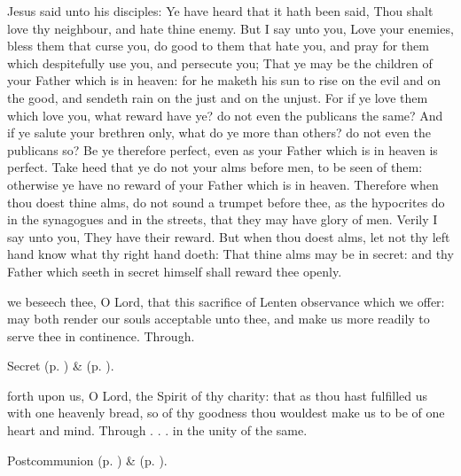  Jesus said unto his disciples: Ye have heard that it hath been said, Thou shalt love thy neighbour, and hate thine enemy. But I say unto you, Love your enemies, bless them that curse you, do good to them that hate you, and pray for them which despitefully use you, and persecute you; That ye may be the children of your Father which is in heaven: for he maketh his sun to rise on the evil and on the good, and sendeth rain on the just and on the unjust. For if ye love them which love you, what reward have ye? do not even the publicans the same? And if ye salute your brethren only, what do ye more than others? do not even the publicans so? Be ye therefore perfect, even as your Father which is in heaven is perfect. Take heed that ye do not your alms before men, to be seen of them: otherwise ye have no reward of your Father which is in heaven. Therefore when thou doest thine alms, do not sound a trumpet before thee, as the hypocrites do in the synagogues and in the streets, that they may have glory of men. Verily I say unto you, They have their reward. But when thou doest alms, let not thy left hand know what thy right hand doeth: That thine alms may be in secret: and thy Father which seeth in secret himself shall reward thee openly.


\secret
{} we beseech thee, O Lord, that this sacrifice of Lenten observance which we offer: may both render our souls acceptable unto thee, and make us more readily to serve thee in continence. Through.

\begin{rubric}
     Secret  (p. \pageref{AshWednesdayMassSecret}) \&   (p. \pageref{SPLivingDeparted}).
\end{rubric}


\postcommunion
{} forth upon us, O Lord, the Spirit of thy charity: that as thou hast fulfilled us with one heavenly bread, so of thy goodness thou wouldest make us to be of one heart and mind. Through . . . in the unity of the same.

\begin{rubric}
     Postcommunion  (p. \pageref{AshWednesdayMassPostcommunion}) \&   (p. \pageref{SPLivingDeparted}).
\end{rubric}

